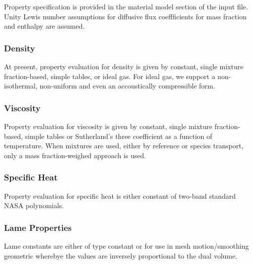 Property specification is provided in the material model section of the input file. 
Unity Lewis number assumptions for diffusive flux coeffficients for mass fraction and enthalpy are assumed.

\subsubsection{Density}
At present, property evaluation for density is given by constant, single mixture fraction-based, simple tables,
or ideal gas. For ideal gas, we support a non-isothermal, non-uniform and even an accoustically compressible form.

\subsubsection{Viscosity}
Property evaluation for viscosity is given by constant, single mixture fraction-based, simple tables
or Sutherland's three coefficient as a function of temperature. When mixtures are used, either by reference or 
species transport, only a mass fraction-weighed approach is used.

\subsubsection{Specific Heat}
Property evaluation for specific heat is either constant of two-band standard NASA polynomials.

\subsubsection{Lame Properties}
Lame constants are either of type constant or for use in mesh motion/smoothing geometric wherebye
the values are inversely proportional to the dual volume.

